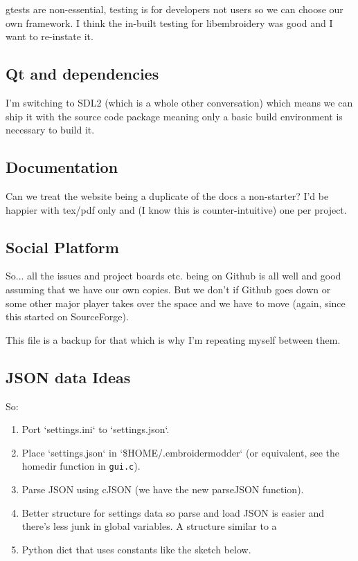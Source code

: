\documentclass[11pt]{report}
\begin{document}
gtests are non-essential, testing is for developers not users so we can
choose our own framework. I think the in-built testing for libembroidery
was good and I want to re-instate it.

\subsection{Qt and dependencies}

I'm switching to SDL2 (which is a whole other conversation) which means
we can ship it with the source code package meaning only a basic build
environment is necessary to build it.

\subsection{Documentation}

Can we treat the website being a duplicate of the docs a non-starter?
I'd be happier with tex/pdf only and (I know this is counter-intuitive)
one per project.

\subsection{Social Platform}

So... all the issues and project boards etc. being on Github is all well and good assuming that we have our own copies. But we don't if Github goes down or some other major player takes over the space and we have to move (again, since this started on SourceForge).

This file is a backup for that which is why I'm repeating myself between them.

\subsection{JSON data Ideas}

So:

\begin{enumerate}
\item Port `settings.ini` to `settings.json`.
\item Place `settings.json` in `\$HOME/.embroidermodder` (or equivalent, see the homedir function in \texttt{gui.c}).
\item Parse JSON using cJSON (we have the new parseJSON function).
\item Better structure for settings data so parse and load JSON is easier and
   there's less junk in global variables. A structure similar to a
\item Python dict that uses constants like the sketch below.
\end{enumerate}
\end{document}
